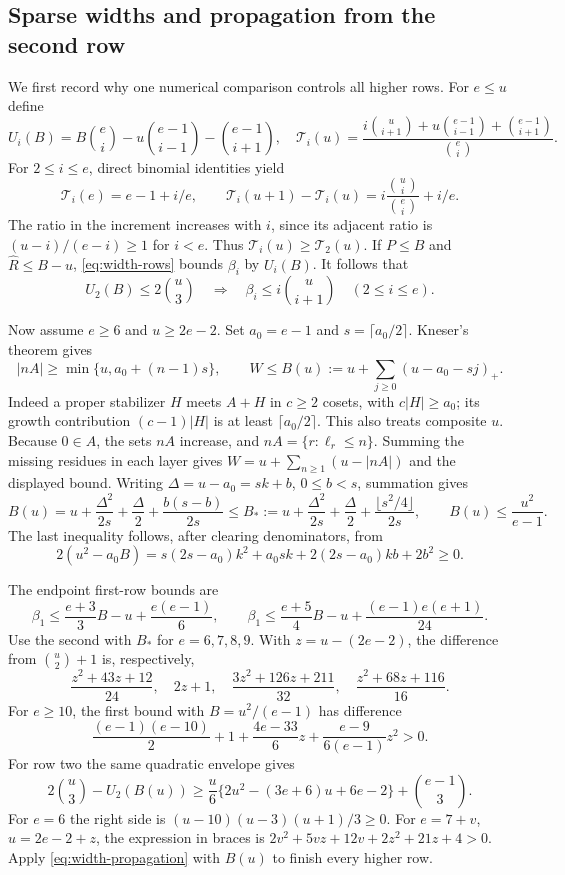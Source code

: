 \subsection{Sparse widths and propagation from the second row}

We first record why one numerical comparison controls all higher rows.
For $e\le u$ define
\[
 U_i(B)=B\binom ei-u\binom{e-1}{i-1}-\binom{e-1}{i+1},
 \quad
 \mathcal T_i(u)=
 \frac{i\binom u{i+1}+u\binom{e-1}{i-1}+\binom{e-1}{i+1}}{\binom ei}.
\]
For $2\le i\le e$, direct binomial identities yield
\[
 \mathcal T_i(e)=e-1+i/e,\qquad
 \mathcal T_i(u+1)-\mathcal T_i(u)
       =i\frac{\binom ui}{\binom ei}+i/e.
\]
The ratio in the increment increases with $i$, since its adjacent ratio
is $(u-i)/(e-i)\ge1$ for $i<e$.  Thus
$\mathcal T_i(u)\ge\mathcal T_2(u)$.
If $P\le B$ and $\widehat R\le B-u$, \eqref{eq:width-rows} bounds
$\beta_i$ by $U_i(B)$.  It follows that
\begin{equation}\label{eq:width-propagation}
 U_2(B)\le2\binom u3
 \quad\Longrightarrow\quad
 \beta_i\le i\binom u{i+1}\quad(2\le i\le e).
\end{equation}

Now assume $e\ge6$ and $u\ge2e-2$.  Set $a_0=e-1$ and
$s=\lceil a_0/2\rceil$.  Kneser's theorem \cite{Kneser} gives
\[
 |nA|\ge\min\{u,a_0+(n-1)s\},\qquad
 W\le B(u):=u+\sum_{j\ge0}(u-a_0-sj)_+.
\]
Indeed a proper stabilizer $H$ meets $A+H$ in $c\ge2$ cosets, with
$c|H|\ge a_0$; its growth contribution $(c-1)|H|$ is at least
$\lceil a_0/2\rceil$.  This also treats composite $u$.
Because $0\in A$, the sets $nA$ increase, and
$nA=\{r:\ell_r\le n\}$.  Summing the missing residues in each layer
gives $W=u+\sum_{n\ge1}(u-|nA|)$ and the displayed bound.
Writing $\Delta=u-a_0=sk+b$, $0\le b<s$, summation gives
\[
 B(u)=u+\frac{\Delta^2}{2s}+\frac\Delta2+\frac{b(s-b)}{2s}
 \le B_*:=u+\frac{\Delta^2}{2s}+\frac\Delta2
                  +\frac{\lfloor s^2/4\rfloor}{2s},
 \qquad B(u)\le\frac{u^2}{e-1}.
\]
The last inequality follows, after clearing denominators, from
\[
 2(u^2-a_0B)=s(2s-a_0)k^2+a_0sk
                  +2(2s-a_0)kb+2b^2\ge0.
\]

The endpoint first-row bounds are
\[
 \beta_1\le\frac{e+3}{3}B-u+\frac{e(e-1)}6,
 \qquad
 \beta_1\le\frac{e+5}{4}B-u+\frac{(e-1)e(e+1)}{24}.
\]
Use the second with $B_*$ for $e=6,7,8,9$.
With $z=u-(2e-2)$, the difference from $\binom u2+1$ is, respectively,
\[
 \frac{z^2+43z+12}{24},\quad 2z+1,\quad
 \frac{3z^2+126z+211}{32},\quad
 \frac{z^2+68z+116}{16}.
\]
For $e\ge10$, the first bound with $B=u^2/(e-1)$ has difference
\[
 \frac{(e-1)(e-10)}2+1+\frac{4e-33}{6}z
                   +\frac{e-9}{6(e-1)}z^2>0.
\]
For row two the same quadratic envelope gives
\[
 2\binom u3-U_2(B(u))\ge
 \frac u6\{2u^2-(3e+6)u+6e-2\}+\binom{e-1}3.
\]
For $e=6$ the right side is $(u-10)(u-3)(u+1)/3\ge0$.
For $e=7+v$, $u=2e-2+z$, the expression in braces is
$2v^2+5vz+12v+2z^2+21z+4>0$.
Apply \eqref{eq:width-propagation} with $B(u)$ to finish every higher row.

